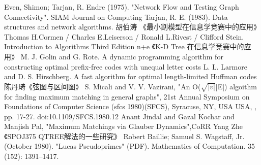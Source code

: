 \begin{thebibliography}{999}
	 Even, Shimon; Tarjan, R. Endre (1975).
	"Network Flow and Testing Graph Connectivity".
    SIAM Journal on Computing
     Tarjan, R. E. (1983).
    Data structures and network algorithms.
    胡伯涛 《最小割模型在信息学竞赛中的应用》
      Thomas H.Cormen / Charles E.Leiserson /
     Ronald L.Rivest / Clifford Stein.
     Introduction to Algorithms Third Edition
    n+e 《K-D Tree 在信息学竞赛中的应用》
    M. J. Golin and G. Rote.
    A dynamic programming algorithm for constructing optimal
    prefix-free codes with unequal letter costs
    L. L. Larmore and D. S. Hirschberg.
    A fast algorithm for optimal length-limited Huffman codes
     陈丹琦《弦图与区间图》
    S. Micali and V. V. Vazirani,
    "An O($\sqrt{|v|}$|E|) algoithm for finding maximum matching
    in general graphs",
     21st Annual Symposium on Foundations of Computer Science (sfcs 1980)(SFCS),
     Syracuse, NY, USA USA, , pp. 17-27.
    doi:10.1109/SFCS.1980.12
     Anant Jindal and Gazal Kochar and Manjish Pal,
    "Maximum Matchings via Glauber Dynamics",CoRR
     Yang Zhe 《SPOJ375 QTREE解法的一些研究》
     Robert Baillie; Samuel S. Wagstaff, Jr. (October 1980).
     "Lucas Pseudoprimes" (PDF). Mathematics of Computation. 35 (152):
      1391–1417.
\end{thebibliography}
